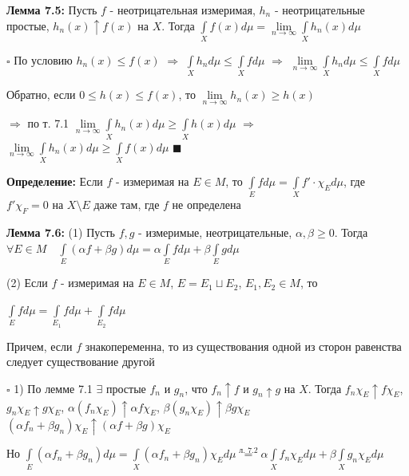 \documentclass[a4paper]{report}
\begin{document}
\noindent\textbf{Лемма 7.5:} Пусть $f$ - неотрицательная измеримая, $h_n$ - неотрицательные простые, $h_n(x)\uparrow f(x)$ на $X$. Тогда $\displaystyle\int\limits_X f(x)d\mu=\lim\limits_{n\to\infty}\displaystyle\int\limits_X h_n(x)d\mu$

\noindent $\square$ По условию $h_n(x)\le f(x)$ $\Rightarrow$ $\displaystyle\int\limits_Xh_nd\mu\le\displaystyle\int\limits_X fd\mu$ $\Rightarrow$ $\lim\limits_{n\to\infty}\displaystyle\int\limits_X h_n
d\mu\le\displaystyle\int\limits_Xfd\mu$

Обратно, если $0\le h(x)\le f(x)$, то $\lim\limits_{n\to\infty} h_n(x)\ge h(x)$

$\Rightarrow$ по т. 7.1 $\lim\limits_{n\to\infty}\displaystyle\int\limits_X h_n(x)d\mu\ge\displaystyle\int\limits_X h(x) d\mu$ $\Rightarrow$ $\lim\limits_{n\to\infty}\displaystyle\int\limits_X h_n(x) d\mu
\ge\displaystyle\int\limits_X f(x) d\mu$ $\blacksquare$
\bigskip

\noindent\textbf{Определение:} Если $f$ - измеримая на $E\in M$, то $\displaystyle\int\limits_E fd\mu=\displaystyle\int\limits_X f'\cdot\chi_Ed\mu$, где $f'\chi_F=0$ на $X\setminus E$ даже там, где $f$ не определена
\bigskip

\noindent\textbf{Лемма 7.6:} (1) Пусть $f,g$ - измеримые, неотрицательные, $\alpha,\beta\ge0$. Тогда $\forall E\in M\quad\displaystyle\int\limits_E(\alpha f+\beta g)d\mu=\alpha
\displaystyle\int\limits_E fd\mu+\beta\displaystyle\int\limits_E gd\mu$

(2) Если $f$ - измеримая на $E\in M$, $E=E_1\sqcup E_2$, $E_1,E_2\in M$, то

$\displaystyle\int\limits_E fd\mu=\displaystyle\int\limits_{E_1}fd\mu+\displaystyle\int\limits_{E_2}fd\mu$

 Причем, если $f$ знакопеременна, то из существования одной из сторон равенства следует существование другой

\noindent $\square$ 1) По лемме 7.1 $\exists$ простые $f_n$ и $g_n$, что $f_n\uparrow f$ и $g_n\uparrow g$ на $X$. Тогда $f_n\chi_E\uparrow f\chi_E$, $g_n\chi_E
\uparrow g\chi_E$, $\alpha(f_n\chi_E)\uparrow\alpha f\chi_E$, $\beta(g_n\chi_E)\uparrow\beta g\chi_E$ $(\alpha f_n+\beta g_n)\chi_E\uparrow(\alpha f+\beta g)\chi_E$

Но $\displaystyle\int\limits_E(\alpha f_n+\beta g_n)d\mu=\displaystyle\int\limits_X(\alpha f_n+\beta g_n)\chi_Ed\mu\stackrel{\text{л. }7.2}{=}\alpha\displaystyle\int\limits_X f_n\chi_Ed\mu+\beta
\displaystyle\int\limits_X g_n\chi_E d\mu$
\end{document}

